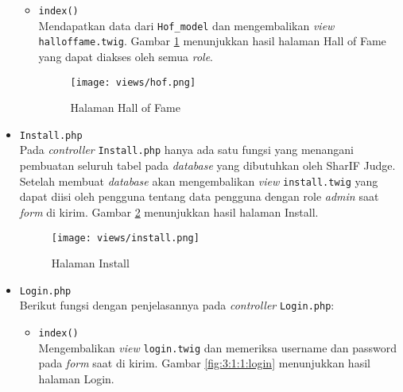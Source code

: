 \begin{itemize}
\begin{itemize}
		      \item \verb|index()| \\
		            Mendapatkan data dari \verb|Hof_model| dan mengembalikan \textit{view} \verb|halloffame.twig|. Gambar \ref{fig:3:1:1:hof} menunjukkan hasil halaman Hall of Fame yang dapat diakses oleh semua \textit{role}.

		            \begin{figure}[H]
			            \centering
			            \texttt{[image: views/hof.png]}
			            \caption{Halaman Hall of Fame}
			            \label{fig:3:1:1:hof}
		            \end{figure}


	      \end{itemize}

	\item \verb|Install.php| \\
	      Pada \textit{controller} \verb|Install.php| hanya ada satu fungsi yang menangani pembuatan seluruh tabel pada \textit{database} yang dibutuhkan oleh SharIF Judge. Setelah membuat \textit{database} akan mengembalikan \textit{view} \verb|install.twig| yang dapat diisi oleh pengguna tentang data pengguna dengan role \textit{admin} saat \textit{form} di kirim. Gambar \ref{fig:3:1:1:install} menunjukkan hasil halaman Install.

	      \begin{figure}[H]
		      \centering
		      \texttt{[image: views/install.png]}
		      \caption{Halaman Install}
		      \label{fig:3:1:1:install}
	      \end{figure}


	\item \verb|Login.php| \\
	      Berikut fungsi dengan penjelasannya pada \textit{controller} \verb|Login.php|:

	      \begin{itemize}
		      \item \verb|index()| \\
		            Mengembalikan \textit{view} \verb|login.twig| dan memeriksa username dan password pada \textit{form} saat di kirim. Gambar \ref{fig:3:1:1:login} menunjukkan hasil halaman Login.


\end{itemize}
\end{itemize}
